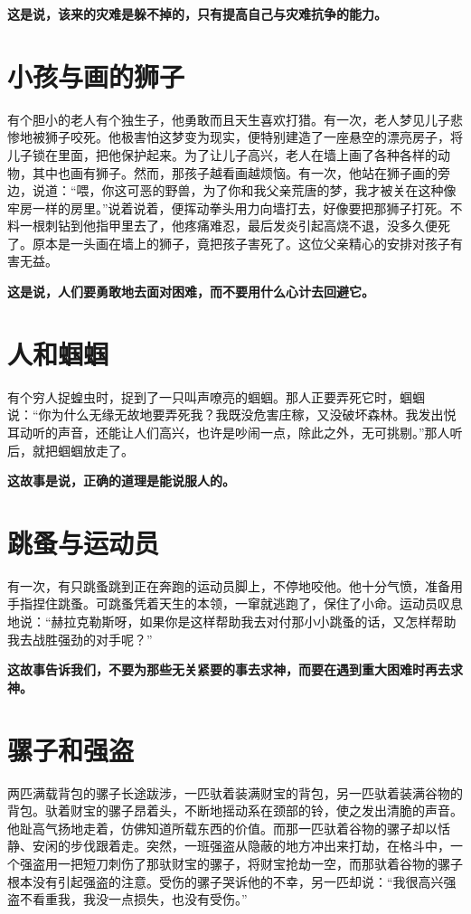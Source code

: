 {\bfseries \color{red}这是说，该来的灾难是躲不掉的，只有提高自己与灾难抗争的能力。}

\section{小孩与画的狮子}

有个胆小的老人有个独生子，他勇敢而且天生喜欢打猎。有一次，老人梦见儿子悲惨地被狮子咬死。他极害怕这梦变为现实，便特别建造了一座悬空的漂亮房子，将儿子锁在里面，把他保护起来。为了让儿子高兴，老人在墙上画了各种各样的动物，其中也画有狮子。然而，那孩子越看画越烦恼。有一次，他站在狮子画的旁边，说道：“喂，你这可恶的野兽，为了你和我父亲荒唐的梦，我才被关在这种像牢房一样的房里。”说着说着，便挥动拳头用力向墙打去，好像要把那狮子打死。不料一根刺钻到他指甲里去了，他疼痛难忍，最后发炎引起高烧不退，没多久便死了。原本是一头画在墙上的狮子，竟把孩子害死了。这位父亲精心的安排对孩子有害无益。

{\bfseries \color{red}这是说，人们要勇敢地去面对困难，而不要用什么心计去回避它。}

\section{人和蝈蝈}

有个穷人捉蝗虫时，捉到了一只叫声嘹亮的蝈蝈。那人正要弄死它时，蝈蝈说：“你为什么无缘无故地要弄死我？我既没危害庄稼，又没破坏森林。我发出悦耳动听的声音，还能让人们高兴，也许是吵闹一点，除此之外，无可挑剔。”那人听后，就把蝈蝈放走了。

{\bfseries \color{red}这故事是说，正确的道理是能说服人的。}

\section{跳蚤与运动员}

有一次，有只跳蚤跳到正在奔跑的运动员脚上，不停地咬他。他十分气愤，准备用手指捏住跳蚤。可跳蚤凭着天生的本领，一窜就逃跑了，保住了小命。运动员叹息地说：“赫拉克勒斯呀，如果你是这样帮助我去对付那小小跳蚤的话，又怎样帮助我去战胜强劲的对手呢？”

{\bfseries \color{red}这故事告诉我们，不要为那些无关紧要的事去求神，而要在遇到重大困难时再去求神。}

\section{骡子和强盗}

两匹满载背包的骡子长途跋涉，一匹驮着装满财宝的背包，另一匹驮着装满谷物的背包。驮着财宝的骡子昂着头，不断地摇动系在颈部的铃，使之发出清脆的声音。他趾高气扬地走着，仿佛知道所载东西的价值。而那一匹驮着谷物的骡子却以恬静、安闲的步伐跟着走。突然，一班强盗从隐蔽的地方冲出来打劫，在格斗中，一个强盗用一把短刀刺伤了那驮财宝的骡子，将财宝抢劫一空，而那驮着谷物的骡子根本没有引起强盗的注意。受伤的骡子哭诉他的不幸，另一匹却说：“我很高兴强盗不看重我，我没一点损失，也没有受伤。”

